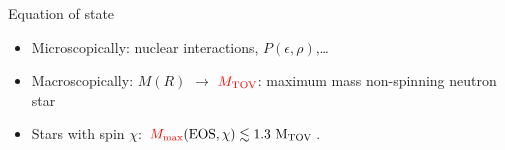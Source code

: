 \documentclass[usenames,dvipsnames,t]{beamer}
\begin{document}
\begin{frame}{Equation of state}

  \def\x{3mm}
  \def\y{3mm}

  \begin{itemize}

    \item Microscopically: nuclear interactions, $P(\epsilon, \rho)$,\dots
    
    \vspace{\x}
    
    \item Macroscopically: $M(R)$ $\rightarrow$ $\textcolor{red}{M_{\rm{TOV}}}$: maximum mass non-spinning neutron star
    
    \vspace{\x}
    
    \item Stars with spin $\chi$: $\textcolor{red}{M_{\rm{max}}}(\rm{EOS}, \chi) \lesssim 1.3 \ M_{\rm{TOV}}$. 
  \end{itemize}

  \vspace{\y}


    
\end{frame}
\end{document}
